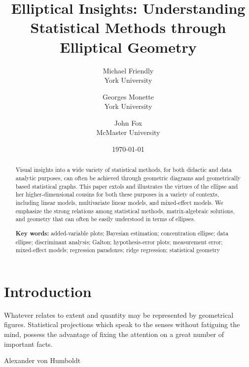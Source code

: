 \documentclass[11pt]{article}%
\newcommand{\keywords}[1]{\par\noindent\textbf{Key words:} #1}
\begin{document}
\begin{titlepage}
\title{Elliptical Insights: Understanding Statistical Methods through Elliptical Geometry}

\author{Michael Friendly%
 \\ York University
\and
Georges Monette \\ York University
\and
John Fox \\ McMaster University
}
\date{\today}
\end{titlepage}
\maketitle

\begin{abstract}
Visual insights into  a wide variety  of statistical methods,  for both didactic
and data analytic purposes, can often be achieved through geometric diagrams  and
geometrically based statistical graphs.  This  paper extols and illustrates  the
virtues  of  the  ellipse  and her  higher-dimensional  cousins  for  both these
purposes in a variety of contexts, including linear models, multivariate
linear models, and mixed-effect models.
We emphasize the strong relations among statistical methods, matrix-algebraic
solutions, and geometry that can often be easily understood in terms of
ellipses.

\keywords{
added-variable plots;
Bayesian estimation;
concentration ellipse;
data ellipse;
discriminant analysis;
Galton;
hypothesis-error plots;
measurement error;
mixed-effect models;
regression paradoxes;
ridge regression;
statistical geometry
}
\end{abstract}

\section{Introduction}

\epigraph{Whatever relates to extent and quantity may be represented by
geometrical figures. Statistical projections which speak to the senses without
fatiguing the mind, possess the advantage of fixing the attention on a great
number of important facts.}{Alexander von Humboldt \citeyearpar[p.~ciii]{Humboldt:1811a}}
\end{document}
